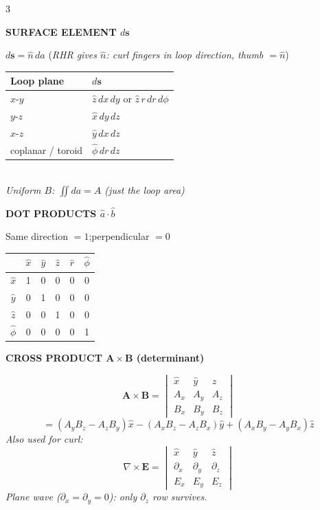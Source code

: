 \documentclass[6pt,letterpaper]{article}
\newcommand{\shead}[3]{%
  \noindent\colorbox{#1}{\parbox{\dimexpr\linewidth-2\fboxsep\relax}%
  {\color{#2}\bfseries\fontsize{6}{7}\selectfont #3}}\vspace{0.5pt}}
\begin{document}
\begin{multicols}{3}
\vspace{2pt}
\shead{purplebg}{purple}{SURFACE ELEMENT $d\mathbf{s}$}
\begin{ebox}
$d\mathbf{s} = \hat{n}\,da$ \quad (\textit{RHR gives $\hat{n}$: curl fingers in loop direction, thumb $= \hat{n}$})\\[2pt]
\begin{tabular}{@{}ll@{}}
\toprule
Loop plane & $d\mathbf{s}$\\
\midrule
\rowcolor{rowB}$x$-$y$ & $\hat{z}\,dx\,dy$ or $\hat{z}\,r\,dr\,d\phi$\\
$y$-$z$ & $\hat{x}\,dy\,dz$\\
\rowcolor{rowB}$x$-$z$ & $\hat{y}\,dx\,dz$\\
coplanar / toroid & $\hat{\phi}\,dr\,dz$\\
\bottomrule
\end{tabular}\\[2pt]
\textit{Uniform $B$: $\iint da = A$ (just the loop area)}
\end{ebox}

\vspace{2pt}
\shead{purplebg}{purple}{DOT PRODUCTS $\hat{a}\cdot\hat{b}$}
\begin{ebox}
Same direction $= 1$;\quad perpendicular $= 0$\\[2pt]
\begin{tabular}{@{}cccccc@{}}
\toprule
& $\hat{x}$ & $\hat{y}$ & $\hat{z}$ & $\hat{r}$ & $\hat{\phi}$\\
\midrule
\rowcolor{rowB}$\hat{x}$ & 1 & 0 & 0 & 0 & 0\\
$\hat{y}$ & 0 & 1 & 0 & 0 & 0\\
\rowcolor{rowB}$\hat{z}$ & 0 & 0 & 1 & 0 & 0\\
$\hat{\phi}$ & 0 & 0 & 0 & 0 & 1\\
\bottomrule
\end{tabular}
\end{ebox}

\vspace{2pt}
\shead{purplebg}{purple}{CROSS PRODUCT $\mathbf{A}\times\mathbf{B}$ (determinant)}
\begin{ebox}
\[
\mathbf{A}\times\mathbf{B}=
\begin{vmatrix}
\hat{x} & \hat{y} & \hat{z}\\
A_x & A_y & A_z\\
B_x & B_y & B_z
\end{vmatrix}
\]
\[=(A_yB_z-A_zB_y)\hat{x}-(A_xB_z-A_zB_x)\hat{y}+(A_xB_y-A_yB_x)\hat{z}\]
\textit{Also used for curl:}
\[\nabla\times\mathbf{E}=
\begin{vmatrix}
\hat{x} & \hat{y} & \hat{z}\\
\partial_x & \partial_y & \partial_z\\
E_x & E_y & E_z
\end{vmatrix}\]
\textit{Plane wave ($\partial_x=\partial_y=0$): only $\partial_z$ row survives.}
\end{ebox}


\end{multicols}
\end{document}
